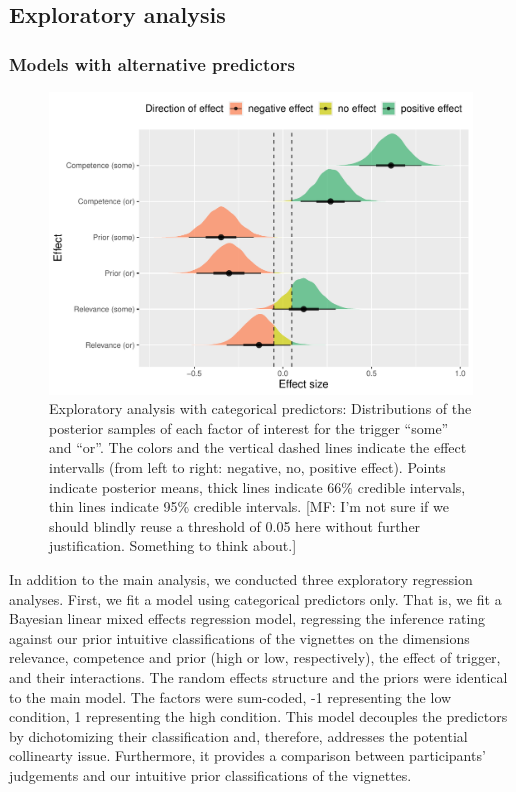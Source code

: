 \documentclass{sp}
\newcommand{\mf}[1]{\textcolor{BurntOrange}{[MF: #1]}}
\begin{document}
\subsection{Exploratory analysis}
\subsubsection{Models with alternative predictors}
\begin{figure}[h]
	\begin{center}
		\includegraphics[width=1\linewidth]{images/posterior-effects-categorical.pdf}
	\end{center}
	\vspace{-0.3cm}
	\caption{Exploratory analysis with categorical predictors: Distributions of the posterior samples of each factor of interest for the trigger ``some'' and ``or''. The colors and the vertical dashed lines indicate the effect intervalls (from left to right: negative, no, positive effect). Points indicate posterior means, thick lines indicate 66\% credible intervals, thin lines indicate 95\% credible intervals. \mf{I'm not sure if we should blindly reuse a threshold of 0.05 here without further justification. Something to think about.}}
	\label{posteriors-cat}
\end{figure}

In addition to the main analysis, we conducted three exploratory regression analyses. First, we fit a model using categorical predictors only. That is, we fit a Bayesian linear mixed effects regression model, regressing the inference rating against our prior intuitive classifications of the vignettes on the dimensions relevance, competence and prior (high or low, respectively), the effect of trigger, and their interactions. The random effects structure and the priors were identical to the main model. The factors were sum-coded, -1 representing the low condition, 1 representing the high condition. 
This model decouples the predictors by dichotomizing their classification and, therefore, addresses the potential collinearty issue. Furthermore, it provides a comparison between participants' judgements and our intuitive prior classifications of the vignettes. 
\end{document}
